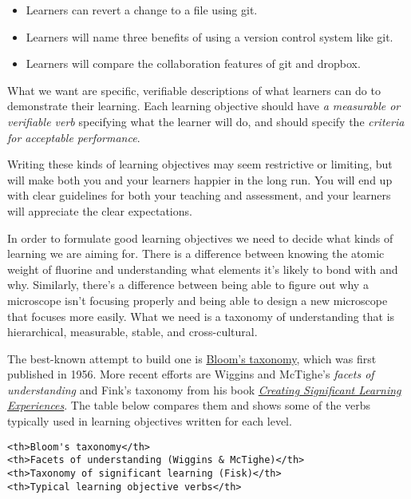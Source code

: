 \begin{itemize}
\itemsep1pt\parskip0pt
\item
  Learners can revert a change to a file using git.
\item
  Learners will name three benefits of using a version control system
  like git.
\item
  Learners will compare the collaboration features of git and dropbox.
\end{itemize}

What we want are specific, verifiable descriptions of what learners can
do to demonstrate their learning. Each learning objective should have
\emph{a measurable or verifiable verb} specifying what the learner will
do, and should specify the \emph{criteria for acceptable performance}.

Writing these kinds of learning objectives may seem restrictive or
limiting, but will make both you and your learners happier in the long
run. You will end up with clear guidelines for both your teaching and
assessment, and your learners will appreciate the clear expectations.

In order to formulate good learning objectives we need to decide what
kinds of learning we are aiming for. There is a difference between
knowing the atomic weight of fluorine and understanding what elements
it's likely to bond with and why. Similarly, there's a difference
between being able to figure out why a microscope isn't focusing
properly and being able to design a new microscope that focuses more
easily. What we need is a taxonomy of understanding that is
hierarchical, measurable, stable, and cross-cultural.

The best-known attempt to build one is
\href{https://en.wikipedia.org/wiki/Bloom's\_taxonomy}{Bloom's taxonomy},
which was first published in 1956. More recent efforts are Wiggins and
McTighe's \emph{facets of understanding} and Fink's taxonomy from his
book
\emph{\href{http://www.amazon.com/Creating-Significant-Learning-Experiences-Integrated/dp/1118124251/}{Creating
Significant Learning Experiences}}. The table below compares them and
shows some of the verbs typically used in learning objectives written
for each level.

\begin{verbatim}
<th>Bloom's taxonomy</th>
<th>Facets of understanding (Wiggins & McTighe)</th>
<th>Taxonomy of significant learning (Fisk)</th>
<th>Typical learning objective verbs</th>
\end{verbatim}

